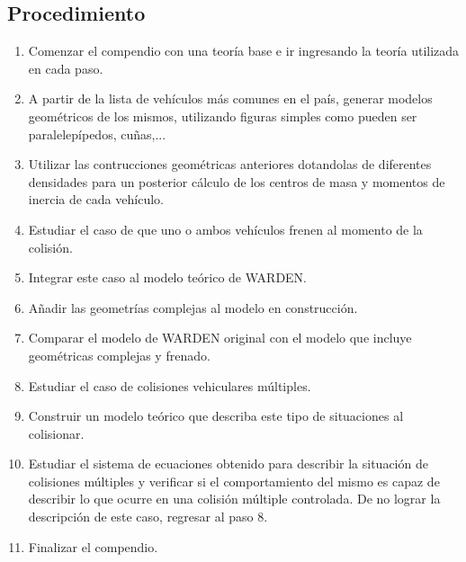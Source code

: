 \begin{singlespace}
\section{Procedimiento}
\begin{enumerate}
\item Comenzar el compendio con una teoría base e ir ingresando la teoría utilizada en cada paso.
\item  A partir de la lista de vehículos más comunes en el país, generar modelos geométricos de los mismos, utilizando figuras simples como pueden ser paralelepípedos, cuñas,...
\item Utilizar las contrucciones geométricas anteriores dotandolas de diferentes densidades para un posterior cálculo de los centros de masa y momentos de inercia de cada vehículo.
\item Estudiar el caso de que uno o ambos vehículos frenen al momento de la colisión.
\item Integrar este caso al modelo teórico de WARDEN.
\item Añadir las geometrías complejas al modelo en construcción.
\item Comparar el modelo de WARDEN original con el modelo que incluye geométricas complejas y frenado.
\item Estudiar el caso de colisiones vehiculares múltiples.
\item Construir un modelo teórico que describa este tipo de situaciones al colisionar.
\item Estudiar el sistema de ecuaciones obtenido para describir la situación de colisiones múltiples y verificar si el comportamiento del mismo es capaz de describir lo que ocurre en una colisión múltiple controlada. De no lograr la descripción de este caso, regresar al paso 8.
\item Finalizar el compendio.
\end{enumerate}

\end{singlespace}